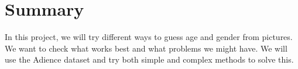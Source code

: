 \documentclass[a4paper,12pt]{article}
\begin{document}
\section{Summary}
In this project, we will try different ways to guess age and gender from pictures. We want to check what works best and what problems we might have. We will use the Adience dataset and try both simple and complex methods to solve this.



\end{document}
